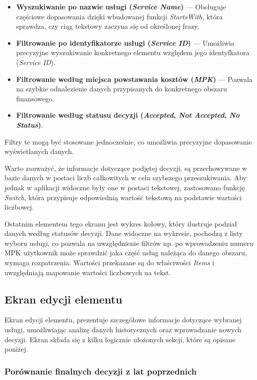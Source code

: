 \begin{itemize}
\item \textbf{Wyszukiwanie po nazwie usługi (\emph{Service Name})} — Obsługuje częściowe dopasowania dzięki wbudowanej funkcji \emph{StartsWith}, która sprawdza, czy ciąg tekstowy zaczyna się od określonej frazy.
\item \textbf{Filtrowanie po identyfikatorze usługi (\emph{Service ID})} — Umożliwia precyzyjne wyszukiwanie konkretnego elementu względem jego identyfkatora (\emph{Service ID}).
\item \textbf{Filtrowanie według miejsca powstawania kosztów (\emph{MPK})} — Pozwala na szybkie odnalezienie danych przypisanych do konkretnego obszaru finansowego.
\item \textbf{Filtrowanie według statusu decyzji (\emph{Accepted}, \emph{Not Accepted}, \emph{No Status})}.
\end{itemize}

Filtry te mogą być stosowane jednocześnie, co umożliwia precyzyjne dopasowanie wyświetlanych danych.

Warto zauważyć, że informacje dotyczące podjętej decyzji, są przechowywane w bazie danych w postaci liczb całkowitych w celu szybszego przeszukiwania. Aby jednak w aplikacji widoczne były one w postaci tekstowej, zastosowano funkcję \emph{Switch}, która przypisuje odpowiednią wartość tekstową na podstawie wartości liczbowej. 
\\
\par
Ostatnim elementem tego ekranu jest wykres kołowy, który ilustruje podział danych według statusów decyzji.
Dane widoczne na wykresie, pochodzą z listy wyboru usługi, co pozwala na uwzględnienie filtrów np. po wprowadzeniu numeru MPK użytkownik może sprawdzić jaka część usług należąca do danego obszaru, wymaga rozpatrzenia. Wartości przekazane są do właściwości \emph{Items} i uwzględniają mapowanie wartości liczbowych na tekst. 



\subsection{Ekran edycji elementu}

Ekran edycji elementu, prezentuje szczegółowe informacje dotyczące wybranej usługi, umożliwiając analizę danych historycznych oraz wprowadzanie nowych decyzji. Ekran składa się z kilku logicznie ułożonych sekcji, które są opisane poniżej.


\subsubsection*{Porównanie finalnych decyzji z lat poprzednich}

